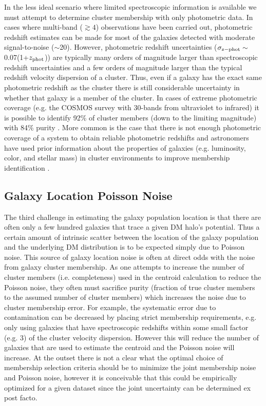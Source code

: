 In the less ideal scenario where limited spectroscopic information is available we must attempt to determine cluster membership with only photometric data.
In cases where multi-band ($\gtrsim 4$) observations have been carried out, photometric redshift estimates can be made for most of the galaxies detected with moderate signal-to-noise ($\sim$20).
However, photometric redshift uncertainties ($\sigma_{\rm z-phot}\sim$0.07(1+$z_{\rm phot}$)) are typically many orders of magnitude larger than spectroscopic redshift uncertainties and a few orders of magnitude larger than the typical redshift velocity dispersion of a cluster.
Thus, even if a galaxy has the exact same photometric redshift as the cluster there is still considerable uncertainty in whether that galaxy is a member of the cluster.
In cases of extreme photometric coverage (e.g. the COSMOS survey with 30-bands from ultraviolet to infrared) it is possible to identify 92\% of cluster members (down to the limiting magnitude) with 84\% purity \citep{George:2011kv}.
More common is the case that there is not enough photometric coverage of a system to obtain reliable photometric redshifts and astronomers have used prior information about the properties of galaxies (e.g. luminosity, color, and stellar mass)  in cluster environments to improve membership identification \citep[see][for a review]{George:2012uo}. 

\subsection{Galaxy Location Poisson Noise}

The third challenge in estimating the galaxy population location is that there are often only a few hundred galaxies that trace a given DM halo's potential.
Thus a certain amount of intrinsic scatter between the location of the galaxy population and the underlying DM distribution is to be expected simply due to Poisson noise.
This source of galaxy location noise is often at direct odds with the noise from galaxy cluster membership.
As one attempts to increase the number of cluster members (i.e. completeness) used in the centroid calculation to reduce the Poisson noise, they often must sacrifice purity (fraction of true cluster members to the assumed number of cluster members) which increases the noise due to cluster membership error.
For example, the systematic error due to contamination can be decreased by placing strict membership requirements, e.g. only using galaxies that have spectroscopic redshifts within some small factor (e.g. 3) of the cluster velocity dispersion.
However this will reduce the number of galaxies that are used to estimate the centroid and the Poisson noise will increase.
At the outset there is not a clear what the optimal choice of membership selection criteria should be to minimize the joint membership noise and Poisson noise, however it is conceivable that this could be empirically optimized for a given dataset since the joint uncertainty can be determined ex post facto.

